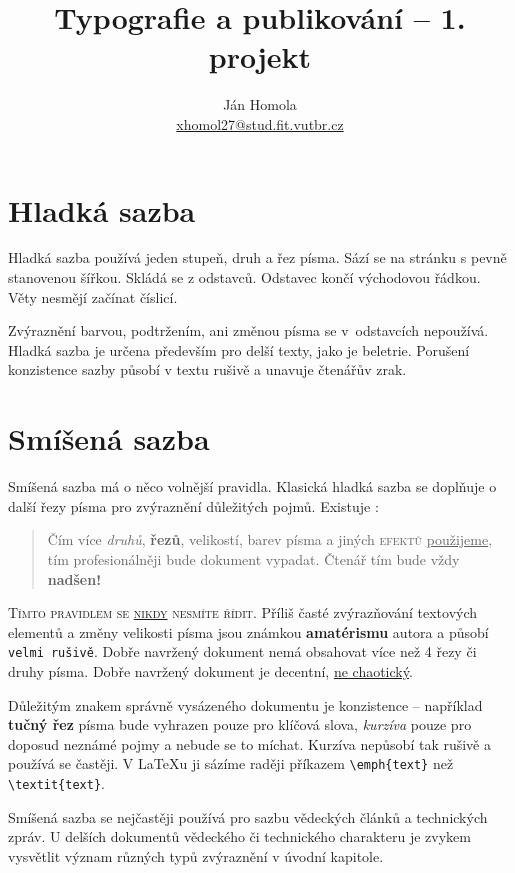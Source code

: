 \documentclass[a4paper, 10pt, twocolumn]{article}
\title{Typografie a publikování -- 1. projekt}
\author{Ján Homola \\ \href{mailto:xhomol27@stud.fit.vutbr.cz}{xhomol27@stud.fit.vutbr.cz}}
\date{}
\begin{document}
\maketitle

\section{Hladká sazba}
\label{section 1}
Hladká sazba používá jeden stupeň, druh a řez písma.
Sází se na stránku s pevně stanovenou šířkou.
Skládá se z odstavců. Odstavec končí východovou řádkou.
Věty nesmějí začínat číslicí.

Zvýraznění barvou, podtržením, ani změnou písma se v~odstavcích nepoužívá.
Hladká sazba je určena především pro delší texty, jako je beletrie.
Porušení konzistence sazby působí v textu rušivě a unavuje čtenářův zrak.

\section{Smíšená sazba}
\label{section 2}
Smíšená sazba má o něco volnější pravidla.
Klasická hladká sazba se doplňuje o další řezy písma pro zvýraznění důležitých pojmů.
Existuje :

\begin{quotation}
    Čím více \textit{druhů}, \textbf{řezů}, {\huge velikostí}, {\color{blue} barev} písma a jiných \textsc{\color{red} efektů} \underline{použijeme}, tím {\color{orange} profesionálněji} bude {\selectfont \Large dokument} vypadat.
    {\tiny Čtenář} tím bude vždy \textbf{\Huge nadšen!}
\end{quotation}

\textsc{Tímto pravidlem se \underline{nikdy} nesmíte řídit}.
Příliš časté zvýrazňování textových elementů a změny {\tiny velikosti} písma jsou známkou \textbf{amatérismu} autora a působí \texttt{velmi rušivě}.
Dobře navržený dokument nemá obsahovat více než 4 řezy či druhy písma.
Dobře navržený dokument je decentní, \underline{ne chaotický}.

Důležitým znakem správně vysázeného dokumentu je konzistence -- například \textbf{tučný řez} písma bude vyhrazen pouze pro klíčová slova, \textit{kurzíva} pouze pro doposud neznámé pojmy a nebude se to míchat.
Kurzíva nepůsobí tak rušivě a používá se častěji.
V \LaTeX u ji sázíme raději příkazem  \verb|\emph{text}|  než \verb|\textit{text}|.

Smíšená sazba se nejčastěji používá pro sazbu vědeckých článků a technických zpráv.
U delších dokumentů vědeckého či technického charakteru je zvykem vysvětlit význam různých typů zvýraznění v úvodní kapitole.
\end{document}
